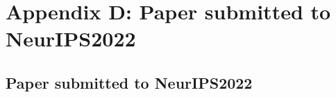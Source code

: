 \chapter*{Appendix D: Paper submitted to NeurIPS2022} \label{Paper}
\setcounter{chapter}{8}
\setcounter{section}{0}
\section*{Paper submitted to NeurIPS2022}
\setcounter{chapter}{0}
\setcounter{section}{0} 
 

